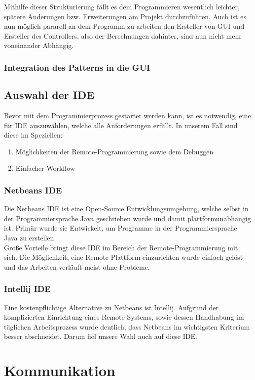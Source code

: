 Mithilfe dieser Strukturierung fällt es dem Programmieren wesentlich leichter, spätere Änderungen bzw. Erweiterungen am Projekt durchzuführen. Auch ist es nun möglich pararell an dem Programm zu arbeiten den Ersteller von GUI und Ersteller des Controllers, also der Berechnungen dahinter, sind nun nicht mehr voneinander Abhängig.


\subsubsection{Integration des Patterns in die GUI}

\subsection{Auswahl der IDE}
Bevor mit dem Programmierprozess gestartet werden kann, ist es notwendig, eine für IDE auszuwählen, welche alle Anforderungen erfüllt. In unserem Fall sind diese im Speziellen:
\begin{enumerate}
    \item Möglichkeiten der Remote-Programmierung sowie dem Debuggen
    \item Einfacher Workflow
\end{enumerate}
\subsubsection{Netbeans IDE}
Die Netbeans IDE ist eine Open-Source Entwicklungsumgebung, welche selbst in der Programmiersprache Java geschrieben wurde und damit plattformunabhängig ist. Primär wurde sie Entwickelt, um Programme in der Programmiersprache Java zu erstellen.\\
Große Vorteile bringt diese IDE im Bereich der Remote-Programmierung mit sich. Die Möglichkeit, eine Remote-Plattform einzurichten wurde einfach gelöst und das Arbeiten verläuft meist ohne Probleme.

\subsubsection{Intellij IDE}
Eine kostenpflichtige Alternative zu Netbeans ist Intellij. Aufgrund der komplizierten Einrichtung eines Remote-Systems, sowie dessen Handhabung im täglichen Arbeitsprozess wurde deutlich, dass Netbeans im wichtigsten Kriterium besser abschneidet. Darum fiel unsere Wahl auch auf diese IDE.

\section{Kommunikation}
\label{sec:communication}
